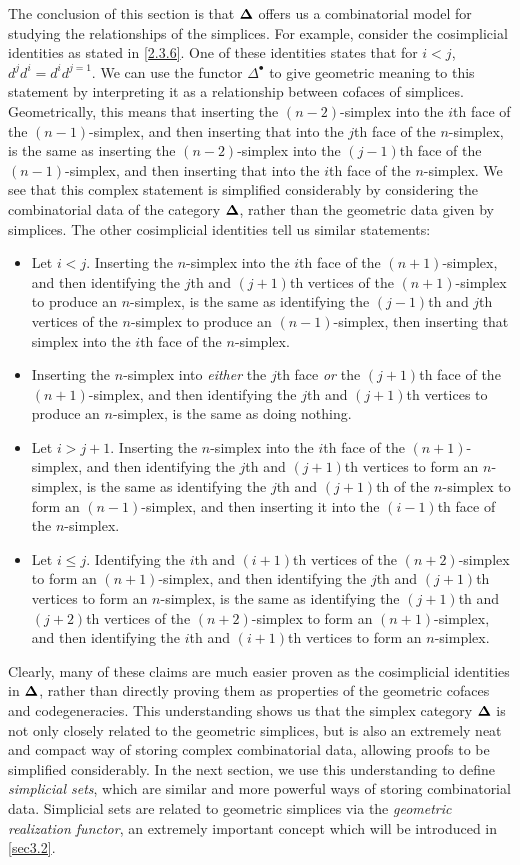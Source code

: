 The conclusion of this section is that $\boldsymbol{\Delta}$ offers us a combinatorial model for studying the relationships of the simplices. For example, consider the cosimplicial identities as stated in \cref{2.3.6}. One of these identities states that for $i<j$, $d^jd^i=d^id^{j=1}$. We can use the functor $\Delta^\bullet$ to give geometric meaning to this statement by interpreting it as a relationship between cofaces of simplices. Geometrically, this means that inserting the $(n-2)$-simplex into the $i$th face of the $(n-1)$-simplex, and then inserting that into the $j$th face of the $n$-simplex, is the same as inserting the $(n-2)$-simplex into the $(j-1)$th face of the $(n-1)$-simplex, and then inserting that into the $i$th face of the $n$-simplex. We see that this complex statement is simplified considerably by considering the combinatorial data of the category $\boldsymbol{\Delta}$, rather than the geometric data given by simplices. The other cosimplicial identities tell us similar statements:
\begin{itemize}
    \item Let $i<j$. Inserting the $n$-simplex into the $i$th face of the $(n+1)$-simplex, and then identifying the $j$th and $(j+1)$th vertices of the $(n+1)$-simplex to produce an $n$-simplex, is the same as identifying the $(j-1)$th and $j$th vertices of the $n$-simplex to produce an $(n-1)$-simplex, then inserting that simplex into the $i$th face of the $n$-simplex.
    \item Inserting the $n$-simplex into \emph{either} the $j$th face \emph{or} the $(j+1)$th face of the $(n+1)$-simplex, and then identifying the $j$th and $(j+1)$th vertices to produce an $n$-simplex, is the same as doing nothing.
    \item Let $i>j+1$. Inserting the $n$-simplex into the $i$th face of the $(n+1)$-simplex, and then identifying the $j$th and $(j+1)$th vertices to form an $n$-simplex, is the same as identifying the $j$th and $(j+1)$th of the $n$-simplex to form an $(n-1)$-simplex, and then inserting it into the $(i-1)$th face of the $n$-simplex.
    \item Let $i\leq j$. Identifying the $i$th and $(i+1)$th vertices of the $(n+2)$-simplex to form an $(n+1)$-simplex, and then identifying the $j$th and $(j+1)$th vertices to form an $n$-simplex, is the same as identifying the $(j+1)$th and $(j+2)$th vertices of the $(n+2)$-simplex to form an $(n+1)$-simplex, and then identifying the $i$th and $(i+1)$th vertices to form an $n$-simplex.
\end{itemize}

Clearly, many of these claims are much easier proven as the cosimplicial identities in $\boldsymbol{\Delta}$, rather than directly proving them as properties of the geometric cofaces and codegeneracies. This understanding shows us that the simplex category $\boldsymbol{\Delta}$ is not only closely related to the geometric simplices, but is also an extremely neat and compact way of storing complex combinatorial data, allowing proofs to be simplified considerably. In the next section, we use this understanding to define \emph{simplicial sets}, which are similar and more powerful ways of storing combinatorial data. Simplicial sets are related to geometric simplices via the \emph{geometric realization functor}, an extremely important concept which will be introduced in \cref{sec3.2}.
